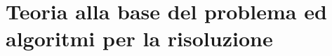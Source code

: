 \chapter{Teoria alla base del problema ed algoritmi per la risoluzione}
\label{chap:teoria}
\Blindtext
